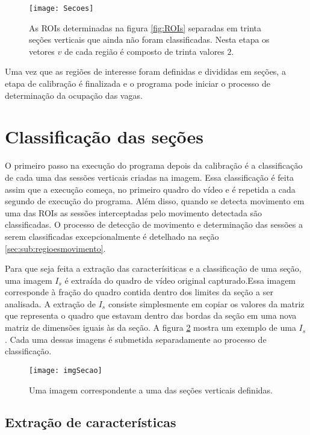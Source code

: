 \begin{figure}
	\centering
	\texttt{[image: Secoes]}
	\label{fig:secoesVerticais}
	\caption{As ROIs determinadas na figura \ref{fig:ROIs} separadas em trinta seções verticais que ainda não foram classificadas. Nesta etapa os vetores $v$ de cada região é composto de trinta valores $2$.}
	\centering
\end{figure}


Uma vez que as regiões de interesse foram definidas e divididas em seções, a etapa de calibração é finalizada e o programa pode iniciar o processo de determinação da ocupação das vagas. 

\section{Classificação das seções} \label{sec:classificacao}

O primeiro passo na execução do programa depois da calibração é a classificação de cada uma das sessões verticais criadas na imagem. Essa classificação é feita assim que a execução começa, no primeiro quadro do vídeo e é repetida a cada segundo de execução do programa. Além disso, quando se detecta movimento em uma das ROIs as sessões interceptadas pelo movimento detectada são classificadas. O processo de detecção de movimento e determinação das sessões a serem classificadas excepcionalmente é detelhado na seção \ref{sec:sub:regioesmovimento}.

Para que seja feita a extração das caracterísiticas e a classificação de uma seção, uma imagem $I_s$ é extraída do quadro de vídeo original capturado.Essa imagem corresponde à fração do quadro contida dentro dos limites da seção a ser analisada. A extração de $I_s$ consiste simplesmente em copiar os valores da matriz que representa o quadro que estavam dentro das bordas da seção em uma nova matriz de dimensões iguais às da seção. A figura \ref{fig:imgSecao} mostra um exemplo de uma $I_s$. Cada uma dessas imagens é submetida separadamente ao processo de classificação.

\begin{figure}
	\centering
	\texttt{[image: imgSecao]}
	\label{fig:imgSecao}
	\caption{Uma imagem correspondente a uma das seções verticais definidas.}
	\centering
\end{figure}


\subsection{Extração de características}

